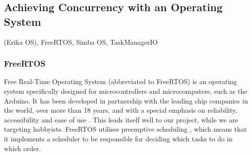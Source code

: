 \subsection{Achieving Concurrency with an Operating System}
(Erika OS), FreeRTOS, Simba OS, TaskManagerIO






\subsubsection{FreeRTOS}

Free Real-Time Operating System (abbreviated to FreeRTOS) is an operating system specifically designed for microcontrollers and microcomputers, such as the Arduino. It has been developed in partnership with the leading chip companies in the world, over more than 18 years, and with a special emphasis on reliability, accessibility and ease of use \cite{AboutRTOS}. This leads itself well to our project, while we are targeting hobbyists. FreeRTOS utilises preemptive scheduling \cite{SchedulingRTOS}, which means that it implements a scheduler to be responsible for deciding which tasks to do in which order.



